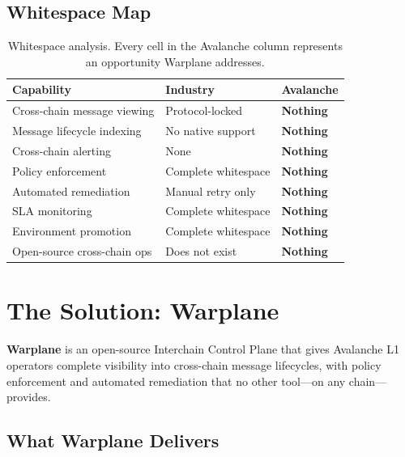 \documentclass[11pt,a4paper]{article}
\begin{document}
\subsection{Whitespace Map}

\begin{table}[h]
\centering
\small
\begin{tabularx}{\textwidth}{@{}L{7cm} C{3cm} C{3cm}@{}}
\toprule
\textbf{Capability} & \textbf{Industry} & \textbf{Avalanche} \\
\midrule
Cross-chain message viewing & Protocol-locked & \textcolor{avaxred}{\textbf{Nothing}} \\
Message lifecycle indexing & No native support & \textcolor{avaxred}{\textbf{Nothing}} \\
Cross-chain alerting & None & \textcolor{avaxred}{\textbf{Nothing}} \\
Policy enforcement & Complete whitespace & \textcolor{avaxred}{\textbf{Nothing}} \\
Automated remediation & Manual retry only & \textcolor{avaxred}{\textbf{Nothing}} \\
SLA monitoring & Complete whitespace & \textcolor{avaxred}{\textbf{Nothing}} \\
Environment promotion & Complete whitespace & \textcolor{avaxred}{\textbf{Nothing}} \\
Open-source cross-chain ops & Does not exist & \textcolor{avaxred}{\textbf{Nothing}} \\
\bottomrule
\end{tabularx}
\caption{Whitespace analysis. Every cell in the Avalanche column represents an opportunity Warplane addresses.}
\end{table}

\section{The Solution: Warplane}

\begin{highlightbox}
\textbf{Warplane} is an open-source Interchain Control Plane that gives Avalanche L1 operators complete visibility into cross-chain message lifecycles, with policy enforcement and automated remediation that no other tool---on any chain---provides.
\end{highlightbox}

\subsection{What Warplane Delivers}
\end{document}
